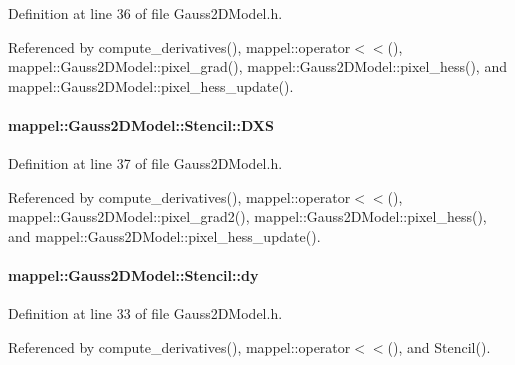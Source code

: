 Definition at line 36 of file Gauss2\+D\+Model.\+h.



Referenced by compute\+\_\+derivatives(), mappel\+::operator$<$$<$(), mappel\+::\+Gauss2\+D\+Model\+::pixel\+\_\+grad(), mappel\+::\+Gauss2\+D\+Model\+::pixel\+\_\+hess(), and mappel\+::\+Gauss2\+D\+Model\+::pixel\+\_\+hess\+\_\+update().

\paragraph[{\texorpdfstring{D\+XS}{DXS}}]{ mappel\+::\+Gauss2\+D\+Model\+::\+Stencil\+::\+D\+XS}\hypertarget{classmappel_1_1Gauss2DModel_1_1Stencil_abd31416e7475994f2a0c8a1b0f1564d4}{}\label{classmappel_1_1Gauss2DModel_1_1Stencil_abd31416e7475994f2a0c8a1b0f1564d4}


Definition at line 37 of file Gauss2\+D\+Model.\+h.



Referenced by compute\+\_\+derivatives(), mappel\+::operator$<$$<$(), mappel\+::\+Gauss2\+D\+Model\+::pixel\+\_\+grad2(), mappel\+::\+Gauss2\+D\+Model\+::pixel\+\_\+hess(), and mappel\+::\+Gauss2\+D\+Model\+::pixel\+\_\+hess\+\_\+update().

\paragraph[{\texorpdfstring{dy}{dy}}]{ mappel\+::\+Gauss2\+D\+Model\+::\+Stencil\+::dy}\hypertarget{classmappel_1_1Gauss2DModel_1_1Stencil_ad5f76b9e7f4c9ca69b4177afc997b1a9}{}\label{classmappel_1_1Gauss2DModel_1_1Stencil_ad5f76b9e7f4c9ca69b4177afc997b1a9}


Definition at line 33 of file Gauss2\+D\+Model.\+h.



Referenced by compute\+\_\+derivatives(), mappel\+::operator$<$$<$(), and Stencil().

